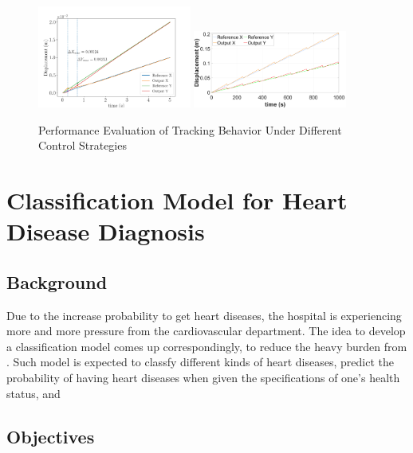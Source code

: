 \documentclass[12pt]{article}
\begin{document}
\begin{enumerate}
    \begin{figure}[H]
        \centering
        \includegraphics[width=0.45\textwidth]{portfolio/fig01_TrackingBehavior.png}
        \includegraphics[width=0.45\textwidth]{portfolio/feedforward_track.png}
        \caption{Performance Evaluation of Tracking Behavior Under Different Control Strategies}
        \label{Control-RobotSwimmer}
    \end{figure}
\end{enumerate}

\newpage



\section{Classification Model for Heart Disease Diagnosis}


\subsection{Background}

Due to the increase probability to get heart diseases, the hospital is experiencing more and more pressure from the cardiovascular department. The idea to develop a classification model comes up correspondingly, to reduce the heavy burden from . Such model is expected to classfy different kinds of heart diseases, predict the probability of having heart diseases when given the specifications of one's health status, and  

\subsection{Objectives}
\end{document}
